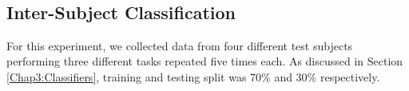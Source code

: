 		\begin{table}[h!]
			\centering
			\caption{Intra-subject Classification using Support Vector Machines, FPR for Calculation, Breathing and Singing Task}
			\label{SICFPR}
			\hfill
			\\
		\end{table}
		\FloatBarrier

	\subsection{Inter-Subject Classification}
    For this experiment, we collected data from four different test subjects performing three different tasks repeated five times each. As discussed in Section \ref{Chap3:Classifiers}, training and testing split was 70\% and 30\% respectively.
